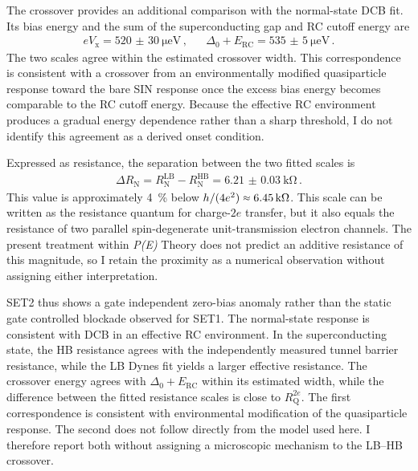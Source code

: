     The crossover provides an additional comparison with the normal-state DCB fit. Its bias energy and the sum of the superconducting gap and RC cutoff energy are
    \begin{align}
        eV_\mathrm{x} = \qty{520(30)}{\micro\electronvolt}\,, &&
        \Delta_0+E_\mathrm{RC} = \qty{535(5)}{\micro\electronvolt}\,.
        \label{eq:ssn-set:dynamic:crossover-energy}
    \end{align}
    The two scales agree within the estimated crossover width. This correspondence is consistent with a crossover from an environmentally modified quasiparticle response toward the bare SIN response once the excess bias energy becomes comparable to the RC cutoff energy. Because the effective RC environment produces a gradual energy dependence rather than a sharp threshold, I do not identify this agreement as a derived onset condition.

    Expressed as resistance, the separation between the two fitted scales is
    \begin{align}
        \Delta R_\mathrm{N} = R_\mathrm{N}^\mathrm{LB}-R_\mathrm{N}^\mathrm{HB} = \qty{6.21(3)}{\kilo\ohm}\,.
        \label{eq:ssn-set:dynamic:resistance-difference}
    \end{align}
    This value is approximately \qty{4}{\percent} below $h/(4e^2)\sapprox\qty{6.45}{\kilo\ohm}$. This scale can be written as the resistance quantum for charge-$2e$ transfer, but it also equals the resistance of two parallel spin-degenerate unit-transmission electron channels. The present treatment within \textit{P(E)} Theory does not predict an additive resistance of this magnitude, so I retain the proximity as a numerical observation without assigning either interpretation.

    SET2 thus shows a gate independent zero-bias anomaly rather than the static gate controlled blockade observed for SET1. The normal-state response is consistent with DCB in an effective RC environment. In the superconducting state, the HB resistance agrees with the independently measured tunnel barrier resistance, while the LB Dynes fit yields a larger effective resistance. The crossover energy agrees with $\Delta_0+E_\mathrm{RC}$ within its estimated width, while the difference between the fitted resistance scales is close to $R_\mathrm{Q}^{2e}$. The first correspondence is consistent with environmental modification of the quasiparticle response. The second does not follow directly from the model used here. I therefore report both without assigning a microscopic mechanism to the LB--HB crossover.

